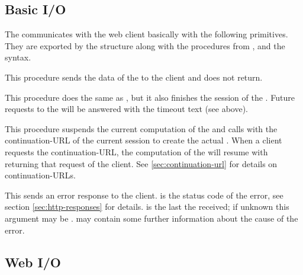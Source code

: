 \subsection{Basic I/O}

The \surflet communicates with the web client basically with the
following  primitives.  They are exported by the
 structure along with the procedures
from ,  and
the  syntax.

\begin{desc}
  This procedure sends the data of the  to the
  client and does not return.
\end{desc}

\begin{desc}
  This procedure does the same as , but it also finishes the
  session of the \surflet.  Future requests to the \surflet will be
  answered with the timeout text (see above).
\end{desc}

\begin{desc}
  This procedure suspends the current computation of the \surflet and
  calls  with the continuation-URL of the
  current session to create the actual .  When a
  client requests the continuation-URL, the computation of the
  \surflet will resume with  returning that request
  of the client.  See \ref{sec:continuation-url} for details on
  continuation-URLs.
\end{desc}

\begin{desc}
  This sends an error response to the client.   is
  the status code of the error, see section \ref{sec:http-responses} for
  details.   is the last  the
  \surflet received; if unknown this argument may be \sharpf.
   may contain some further information about the cause
  of the error.
\end{desc}


\subsection{Web I/O}

